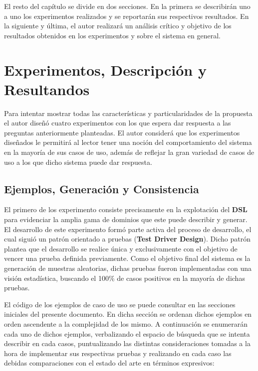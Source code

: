 El resto del capítulo se divide en dos secciones. En la primera se describirán uno a uno los
experimentos realizados y se reportarán sus respectivos resultados. En la siguiente y última,
el autor realizará un análisis crítico y objetivo de los resultados obtenidos en los experimentos
y sobre el sistema en general.

\section{Experimentos, Descripción y Resultandos}

Para intentar mostrar todas las características y particularidades de la propuesta el autor diseñó
cuatro experimentos con los que espera dar respuesta a las preguntas anteriormente planteadas. El
autor considerá que los experimentos diseñados le permitirá al lector tener una noción del
comportamiento del sistema en la mayoría de sus casos de uso, además de reflejar la gran variedad de
casos de uso a los que dicho sistema puede dar respuesta.

\subsection{Ejemplos, Generación y Consistencia}

El primero de los experimento consiste precisamente en la explotación del {\bf DSL} para evidenciar la
amplia gama de dominios que este puede describir y generar. El desarrollo de este experimento
formó parte activa del proceso de desarrollo, el cual siguió un patrón orientado a pruebas ({\bf Test
            Driver Design}). Dicho patrón plantea que el desarrollo se realice única y exclusivamente con el
objetivo de vencer una prueba definida previamente. Como el objetivo final del sistema es la
generación de muestras aleatorias, dichas pruebas fueron implementadas con una visión estadística,
buscando el 100\% de casos positivos en la mayoría de dichas pruebas.

El código de los ejemplos de caso de uso se puede consultar en las secciones iniciales del presente
documento. En dicha sección se ordenan dichos ejemplos en orden ascendente a la complejidad de los
mismo. A continuación se enumerarán cada uno de dichos ejemplos, verbalizando el espacio de búsqueda
que se intenta describir en cada casos, puntualizando las distintas consideraciones tomadas a la hora
de implementar sus respectivas pruebas y realizando en cada caso las debidas comparaciones con el
estado del arte en términos expresivos:

